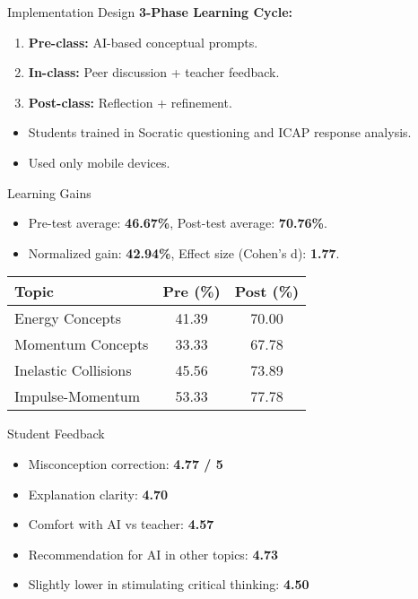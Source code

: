 \documentclass{beamer}
\begin{document}
\begin{frame}{Implementation Design}
\textbf{3-Phase Learning Cycle:}
\begin{enumerate}
    \item \textbf{Pre-class:} AI-based conceptual prompts.
    \item \textbf{In-class:} Peer discussion + teacher feedback.
    \item \textbf{Post-class:} Reflection + refinement.
\end{enumerate}
\begin{itemize}
    \item Students trained in Socratic questioning and ICAP response analysis.
    \item Used only mobile devices.
\end{itemize}
\end{frame}

\begin{frame}{Learning Gains}
\begin{itemize}
    \item Pre-test average: \textbf{46.67\%}, Post-test average: \textbf{70.76\%}.
    \item Normalized gain: \textbf{42.94\%}, Effect size (Cohen's d): \textbf{1.77}.
\end{itemize}
\begin{table}[ht]
\centering
\begin{tabular}{@{}lcc@{}}
\toprule
\textbf{Topic} & \textbf{Pre (\%)} & \textbf{Post (\%)} \\
\midrule
Energy Concepts & 41.39 & 70.00 \\
Momentum Concepts & 33.33 & 67.78 \\
Inelastic Collisions & 45.56 & 73.89 \\
Impulse-Momentum & 53.33 & 77.78 \\
\bottomrule
\end{tabular}
\end{table}
\end{frame}

\begin{frame}{Student Feedback}
\begin{itemize}
    \item Misconception correction: \textbf{4.77 / 5}
    \item Explanation clarity: \textbf{4.70}
    \item Comfort with AI vs teacher: \textbf{4.57}
    \item Recommendation for AI in other topics: \textbf{4.73}
    \item Slightly lower in stimulating critical thinking: \textbf{4.50}
\end{itemize}
\end{frame}
\end{document}
